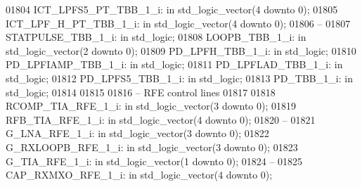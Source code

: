 \begin{DoxyCode}
01804     ICT\_LPFS5\_PT\_TBB\_1\_i:   \textcolor{keywordflow}{in} \textcolor{comment}{std\_logic\_vector}(\textcolor{vhdllogic}{}\textcolor{vhdllogic}{4} \textcolor{keywordflow}{downto} \textcolor{vhdllogic}{}\textcolor{vhdllogic}{0});
01805     ICT\_LPF\_H\_PT\_TBB\_1\_i:   \textcolor{keywordflow}{in} \textcolor{comment}{std\_logic\_vector}(\textcolor{vhdllogic}{}\textcolor{vhdllogic}{4} \textcolor{keywordflow}{downto} \textcolor{vhdllogic}{}\textcolor{vhdllogic}{0});
01806 \textcolor{keyword}{    --}
01807     STATPULSE\_TBB\_1\_i:  \textcolor{keywordflow}{in} \textcolor{comment}{std\_logic};
01808     LOOPB\_TBB\_1\_i:  \textcolor{keywordflow}{in} \textcolor{comment}{std\_logic\_vector}(\textcolor{vhdllogic}{}\textcolor{vhdllogic}{2} \textcolor{keywordflow}{downto} \textcolor{vhdllogic}{}\textcolor{vhdllogic}{0});
01809     PD\_LPFH\_TBB\_1\_i:    \textcolor{keywordflow}{in} \textcolor{comment}{std\_logic};
01810     PD\_LPFIAMP\_TBB\_1\_i: \textcolor{keywordflow}{in} \textcolor{comment}{std\_logic};
01811     PD\_LPFLAD\_TBB\_1\_i:  \textcolor{keywordflow}{in} \textcolor{comment}{std\_logic};
01812     PD\_LPFS5\_TBB\_1\_i:   \textcolor{keywordflow}{in} \textcolor{comment}{std\_logic};
01813     PD\_TBB\_1\_i: \textcolor{keywordflow}{in} \textcolor{comment}{std\_logic};
01814 
01815 
01816 \textcolor{keyword}{    -- RFE control lines}
01817 
01818     RCOMP\_TIA\_RFE\_1\_i:  \textcolor{keywordflow}{in} \textcolor{comment}{std\_logic\_vector}(\textcolor{vhdllogic}{}\textcolor{vhdllogic}{3} \textcolor{keywordflow}{downto} \textcolor{vhdllogic}{}\textcolor{vhdllogic}{0});
01819     RFB\_TIA\_RFE\_1\_i:    \textcolor{keywordflow}{in} \textcolor{comment}{std\_logic\_vector}(\textcolor{vhdllogic}{}\textcolor{vhdllogic}{4} \textcolor{keywordflow}{downto} \textcolor{vhdllogic}{}\textcolor{vhdllogic}{0});
01820 \textcolor{keyword}{    --}
01821     G\_LNA\_RFE\_1\_i:  \textcolor{keywordflow}{in} \textcolor{comment}{std\_logic\_vector}(\textcolor{vhdllogic}{}\textcolor{vhdllogic}{3} \textcolor{keywordflow}{downto} \textcolor{vhdllogic}{}\textcolor{vhdllogic}{0});
01822     G\_RXLOOPB\_RFE\_1\_i:  \textcolor{keywordflow}{in} \textcolor{comment}{std\_logic\_vector}(\textcolor{vhdllogic}{}\textcolor{vhdllogic}{3} \textcolor{keywordflow}{downto} \textcolor{vhdllogic}{}\textcolor{vhdllogic}{0});
01823     G\_TIA\_RFE\_1\_i:  \textcolor{keywordflow}{in} \textcolor{comment}{std\_logic\_vector}(\textcolor{vhdllogic}{}\textcolor{vhdllogic}{1} \textcolor{keywordflow}{downto} \textcolor{vhdllogic}{}\textcolor{vhdllogic}{0});
01824 \textcolor{keyword}{    --}
01825     CAP\_RXMXO\_RFE\_1\_i:  \textcolor{keywordflow}{in} \textcolor{comment}{std\_logic\_vector}(\textcolor{vhdllogic}{}\textcolor{vhdllogic}{4} \textcolor{keywordflow}{downto} \textcolor{vhdllogic}{}\textcolor{vhdllogic}{0});

\end{DoxyCode}
